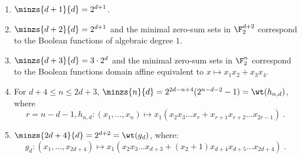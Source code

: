 \begin{proposition}
\enumroman
$ $\newline %
\begin{enumerate}
\item $\minzs{d+1}{d} = 2^{d+1}$.
\item $\minzs{d+2}{d} = 2^{d+1}$ and the minimal zero-sum sets in $\F_2^{d+2}$ correspond to the Boolean functions of algebraic degree $1$.
\item $\minzs{d+3}{d} = 3 \cdot 2^{d}$ and the minimal zero-sum sets in $\F_2^n$ correspond to the Boolean functions domain affine equivalent to $x \mapsto x_1x_2 + x_3x_4$.
\item For $d + 4 \le n \le 2d+3$, $\minzs{n}{d} = 2^{2d-n+4}(2^{n-d-2}-1) = \wt(h_{n,d})$,
where 
\[
r=n-d-1, h_{n,d}\colon (x_1,\dots,x_n) \mapsto x_1(x_2x_3\dots x_{r} + x_{r+1}x_{r+2}\dots x_{2r-1})\;.
\]
\item $\minzs{2d+4}{d} = 2^{d+2} = \wt(g_d)$, where: \[
g_d\colon (x_1,\dots,x_{2d+4}) \mapsto x_1(x_2x_3\dots x_{d+3} + (x_2+1)x_{d+4}x_{d+5}\dots x_{2d+4})\;.
\]
\end{enumerate}
\end{proposition}
